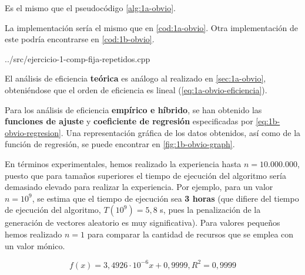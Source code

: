 
Es el mismo que el pseudocódigo \ref{alg:1a-obvio}. 


La implementación sería el mismo que en \ref{cod:1a-obvio}. Otra implementación de este podría encontrarse en \ref{cod:1b-obvio}. 


{../src/ejercicio-1-comp-fija-repetidos.cpp} 


El análisis de eficiencia \textbf{teórica} es análogo al realizado en \ref{sec:1a-obvio}, obteniéndose 
que el orden de eficiencia es lineal (\ref{eq:1a-obvio-eficiencia}). 

Para los análisis de eficiencia \textbf{empírico e híbrido}, se han obtenido las \textbf{funciones de ajuste}
y \textbf{coeficiente de regresión} especificadas por \ref{eq:1b-obvio-regresion}. Una representación
gráfica de los datos obtenidos, así como de la función de regresión, se puede encontrar en \ref{fig:1b-obvio-graph}. 

En términos experimentales, hemos realizado la experiencia hasta $n=10.000.000$, puesto que para tamaños superiores
el tiempo de ejecución del algoritmo sería demasiado elevado para realizar la experiencia. Por ejemplo, para un valor
$n=10^9$, se estima que el tiempo de ejecución sea \textbf{3 horas} (que difiere del tiempo de ejecución del algoritmo,
$T(10^9) = 5,8$ s, pues la penalización de la generación de vectores aleatorio es muy significativa). 
Para valores pequeños hemos realizado $n=1$ para comparar la cantidad de recursos que se emplea con un valor mónico. 

\begin{equation}
    \boxed{f(x) = 3,4926 \cdot 10 ^{-6} x + 0,9999, R^2 = 0,9999}
    \label{eq:1b-obvio-regresion}
\end{equation}

